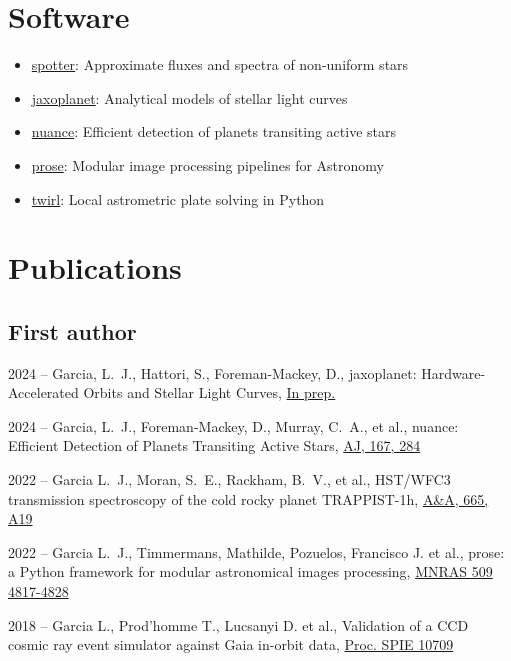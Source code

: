 \documentclass[10pt,letterpaper]{article}
\newcommand{\publi}[4]{\item #1 -- #3, #2, #4}
\newcommand{\aj}{AJ}
\newcommand{\aap}{A\&A}
\begin{document}
\section*{Software}
\begin{itemize}
    \item \textsf{\href{https://github.com/lgrcia/spotter}{spotter}}: Approximate fluxes and spectra of non-uniform stars
    \item \textsf{\href{https://github.com/exoplanet-dev/jaxoplanet}{jaxoplanet}}: Analytical models of stellar light curves
    \item \textsf{\href{https://github.com/lgrcia/nuance}{nuance}}: Efficient detection of planets transiting active stars
    \item \textsf{\href{https://github.com/lgrcia/prose}{prose}}: Modular image processing pipelines for Astronomy
    \item \textsf{\href{https://github.com/lgrcia/twirl}{twirl}}: Local astrometric plate solving in Python 
\end{itemize}
\section*{Publications}
\subsection*{First author}

\begin{etaremune}
\publi{2024}{\textsf{jaxoplanet}: Hardware-Accelerated Orbits and Stellar Light Curves}
{Garcia, L.~J., Hattori, S., Foreman-Mackey, D.}
{\href{https://raw.githubusercontent.com/lgrcia/paper-jaxoplanet/main/latex/jaxoplanet_draft_20241017.pdf}{In prep.}}


\publi{2024}{\textsf{nuance}: Efficient Detection of Planets Transiting Active Stars}
{Garcia, L.~J., Foreman-Mackey, D., Murray, C.~A., et al.}
{\href{https://ui.adsabs.harvard.edu/abs/2024AJ....167..284G}{\aj, 167, 284}}

\publi{2022}{HST/WFC3 transmission spectroscopy of the cold rocky planet TRAPPIST-1h}
{Garcia L.~J., Moran, S.~E., Rackham, B.~V., et al.}
{\href{https://ui.adsabs.harvard.edu/abs/2022A\&A...665A..19G}{\aap, 665, A19}}

\publi{2022}{\textsf{prose}: a Python framework for modular astronomical images processing}
{Garcia L.~J., Timmermans, Mathilde, Pozuelos, Francisco J. et al.}
{\href{https://ui.adsabs.harvard.edu/abs/2022MNRAS.509.4817G/exportcitation}{MNRAS 509 4817-4828}}

\publi{2018}{Validation of a CCD cosmic ray event simulator against Gaia in-orbit data}
{Garcia L., Prod'homme T., Lucsanyi D. et al.}
{\href{http://doi.org/10.1117/12.2314090}{Proc. SPIE 10709}}

\end{etaremune}
\end{document}
